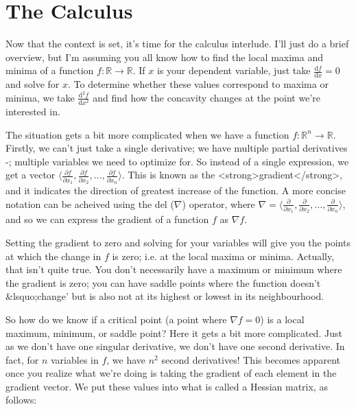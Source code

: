 \documentclass{article}
\begin{document}
\section{The Calculus}
Now that the context is set, it's time for the calculus interlude. I'll just do a brief overview, but I'm assuming you all know how to find the local maxima and minima of a function \(f : \mathbb{R} \rightarrow \mathbb{R} \). If \(x\) is your dependent variable, just take \(\frac{\mathrm{d}f}{\mathrm{d}x} = 0\) and solve for \(x\). To determine whether these values correspond to maxima or minima, we take \(\frac{\mathrm{d}^{2}f}{\mathrm{d}x^{2}}\) and find how the concavity changes at the point we're interested in.

The situation gets a bit more complicated when we have a function \(f : \mathbb{R}^{n} \rightarrow \mathbb{R} \). Firstly, we can't just take a single derivative; we have multiple partial derivatives -; multiple variables we need to optimize for. So instead of a single expression, we get a vector \( \langle \frac{\partial f}{\partial x_{1}} , \frac{\partial f}{\partial x_{2}}, \hdots , \frac{\partial f}{\partial x_{n}} \rangle \). This is known as the <strong>gradient</strong>, and it indicates the direction of greatest increase of the function. A more concise notation can be acheived using the del (\(\nabla\)) operator, where \(\nabla = \langle \frac{\partial}{\partial x_{1}} , \frac{\partial}{\partial x_{2}}, \hdots , \frac{\partial}{\partial x_{n}} \rangle \), and so we can express the gradient of a function \(f\) as \(\nabla f\).

Setting the gradient to zero and solving for your variables will give you the points at which the change in \(f\) is zero; i.e. at the local maxima or minima. Actually, that isn't quite true. You don't necessarily have a maximum or minimum where the gradient is zero; you can have saddle points where the function doesn't &lsquo;change' but is also not at its highest or lowest in its neighbourhood. 

So how do we know if a critical point (a point where \(\nabla f = 0\)) is a local maximum, minimum, or saddle point? Here it gets a bit more complicated. Just as we don't have one singular derivative, we don't have one second derivative. In fact, for \(n\) variables in \(f\), we have \(n^{2}\) second derivatives! This becomes apparent once you realize what we're doing is taking the gradient of each element in the gradient vector. We put these values into what is called a Hessian matrix, as follows:
\end{document}
